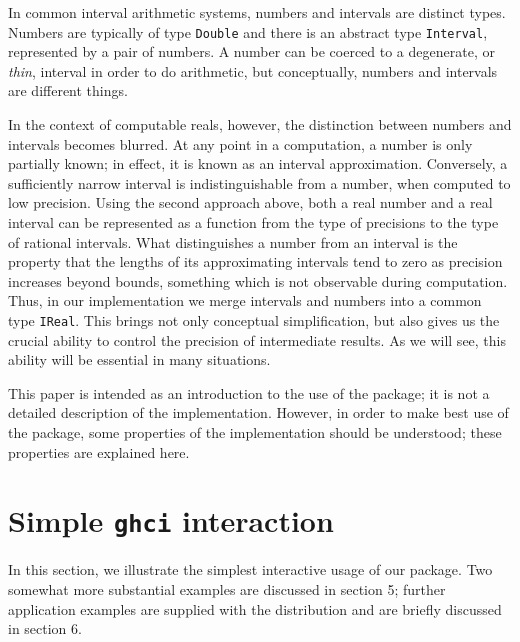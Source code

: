\documentclass[9pt, a4, twocolumn]{article}
\begin{document}
In common interval arithmetic systems, numbers and intervals are 
distinct types. Numbers are typically of type \texttt{Double} and there is an
abstract type \texttt{Interval}, represented by a pair of numbers. 
A number can be coerced to a degenerate, or \emph{thin}, interval in order to
do arithmetic, but conceptually, numbers and intervals are different
things.

In the context of computable reals, however,
the distinction between numbers and intervals becomes blurred. At any point
in a computation, a number is only partially known; in effect, it is known
as an interval approximation. Conversely, a sufficiently narrow interval
is indistinguishable from a number, when computed to low precision.
Using the second approach above, both a real number and a real
interval can be represented as a function from the type of precisions to
the type of rational intervals. What distinguishes a number from
an interval is the property that the lengths of its approximating
intervals tend to zero as precision increases beyond bounds, something which is not
observable during computation. Thus, in our implementation we merge
intervals and numbers into a common type \texttt{IReal}. This brings
not only conceptual simplification, but also gives us
the crucial ability to control the precision of intermediate results.
As we will see, this ability will be essential in many situations.

This paper is intended as an introduction to the use of the package;
it is not a detailed description of the implementation. However, in
order to make best use of the package, some properties of the
implementation should be understood; these properties are explained here.

\section{Simple \texttt{ghci} interaction}

In this section, we illustrate the simplest interactive usage of our
package. Two somewhat more substantial examples are discussed in 
section 5; further application examples are supplied with 
the distribution and are briefly discussed in section 6.
\end{document}
